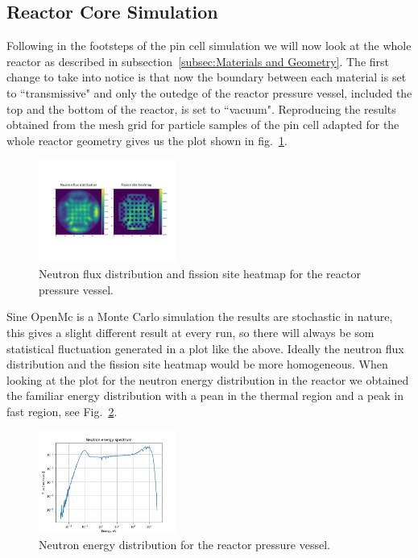 \documentclass[twocolumn,a4paper,10pt]{article}
\begin{document}
\newpage

\subsection[Reactor Core Simulation]{\centering Reactor Core Simulation}
\label{subsec:Reactor Core Simulation}

\par
Following in the footsteps of the pin cell simulation we will now look at the whole reactor as described in subsection~\ref{subsec:Materials and Geometry}. The first change to take into notice is that now the boundary between each material is set to ``transmissive" and only the outedge of the reactor pressure vessel, included the top and the bottom of the reactor, is set to ``vacuum". Reproducing the results obtained from the mesh grid for particle samples of the pin cell adapted for the whole reactor geometry gives us the plot shown in fig.~\ref{fig:meshRPV}.

\begin{figure}[ht]
  \centering
  \includegraphics[width=0.4\textwidth]{../Pictures/Mesh_RPV.png}
  \caption{Neutron flux distribution and fission site heatmap for the reactor pressure vessel.}
  \label{fig:meshRPV}
\end{figure}

\par
Sine OpenMc is a Monte Carlo simulation the results are stochastic in nature, this gives a slight different result at every run, so there will always be som statistical fluctuation generated in a plot like the above. Ideally the neutron flux distribution and the fission site heatmap would be more homogeneous. When looking at the plot for the neutron energy distribution in the reactor we obtained the familiar energy distribution with a pean in the thermal region and a peak in fast region, see Fig.~\ref{fig:EnergyRPV}.

\begin{figure}[b]
  \centering
  \includegraphics[width=0.4\textwidth]{../Pictures/Energy.png}
  \caption{Neutron energy distribution for the reactor pressure vessel.}
  \label{fig:EnergyRPV}
\end{figure}
\end{document}
